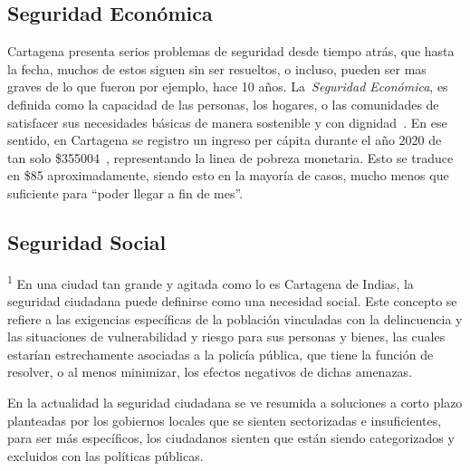 \documentclass[letterpaper, 12pt]{article}
\newcommand{\cop}[1]{\$\SI{#1}{\COP}}
\newcommand{\dollar}[1]{\$\SI{#1}{\DOLLAR}}
\begin{document}


\subsection*{Seguridad Económica}

Cartagena presenta serios problemas de seguridad desde
tiempo atrás, que hasta la fecha, muchos de estos siguen
sin ser resueltos, o incluso, pueden ser mas graves de lo
que fueron por ejemplo, hace 10 años. La~\textit{Seguridad
    Económica}, es definida como la capacidad de las personas,
los hogares, o las comunidades de satisfacer sus
necesidades básicas de manera sostenible y con
dignidad~\cite{DeLaCruzRoja_2015}. En ese sentido, en
Cartagena se registro un ingreso per cápita durante el año
2020 de tan solo \cop{355004}~\cite{DANE_2021},
representando la linea de pobreza monetaria. Esto se
traduce en \dollar{85} aproximadamente, siendo esto en la
mayoría de casos, mucho menos que suficiente para ``poder
llegar a fin de mes''.


\subsection*{Seguridad Social}

\textsuperscript{1} En una ciudad tan grande y agitada como
lo es Cartagena de Indias, la seguridad ciudadana puede definirse como una
necesidad social. Este concepto se refiere a las exigencias
específicas de la población vinculadas con la delincuencia
y las situaciones de vulnerabilidad y riesgo para sus
personas y bienes, las cuales estarían estrechamente
asociadas a la policía pública, que tiene la función de
resolver, o al menos minimizar, los efectos negativos de
dichas amenazas.


En la actualidad la seguridad ciudadana se ve resumida a
soluciones a corto plazo planteadas por los gobiernos
locales que se sienten sectorizadas e insuficientes, para
ser más específicos, los ciudadanos sienten que están
siendo categorizados y excluidos con las políticas
públicas.
\end{document}
